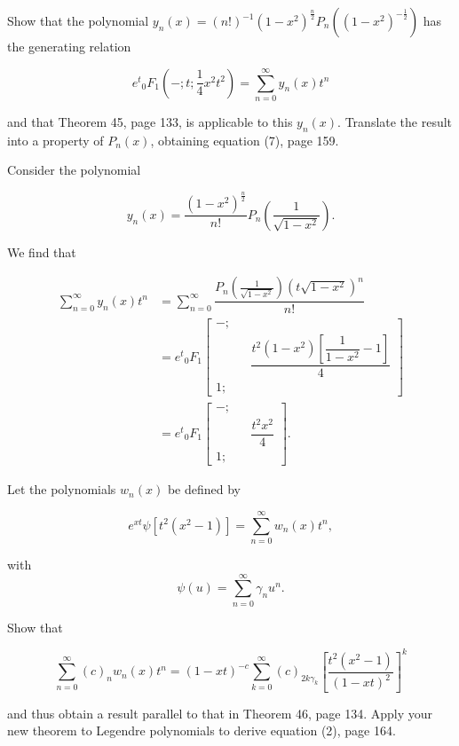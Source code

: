 \begin{problem}\label{problem20chapter10}
Show that the polynomial $y_n(x) = (n!)^{-1}(1-x^2)^{\frac{n}{2}} P_n((1-x^2)^{-\frac{1}{2}})$ has the generating relation

$$e^t {}_0F_1 \left( -;t;\dfrac{1}{4}x^2t^2 \right) = \displaystyle\sum_{n=0}^{\infty} y_n(x) t^n$$

and that Theorem 45, page 133, is applicable to this $y_n(x)$. Translate the result into a property of $P_n(x)$, obtaining equation (7), page 159.
\end{problem}
\begin{solution}
Consider the polynomial

$$y_n(x) = \dfrac{(1-x^2)^{\frac{n}{2}}}{n!} P_n \left( \dfrac{1}{\sqrt{1-x^2}} \right).$$

We find that

$$\begin{array}{ll}
\displaystyle\sum_{n=0}^{\infty} y_n(x) t^n &= \displaystyle\sum_{n=0}^{\infty} \dfrac{P_n \left(\frac{1}{\sqrt{1-x^2}} \right) (t \sqrt{1-x^2})^n}{n!} \\
&= e^t {}_0F_1 \left[ \begin{array}{rlr}
-; & & \\
& & \dfrac{t^2 (1-x^2) \left[ \dfrac{1}{1-x^2} -1 \right]}{4} \\
1; & &
\end{array} \right] \\
&= e^t {}_0F_1 \left[ \begin{array}{rlr}
-; & & \\
& & \dfrac{t^2x^2}{4} \\
1; & & 
\end{array} \right].
\end{array}$$
\end{solution}
\begin{problem}\label{problem21chapter10}
Let the polynomials $w_n(x)$ be defined by

$$e^{xt} \psi[t^2(x^2-1)] = \displaystyle\sum_{n=0}^{\infty} w_n(x) t^n,$$

with
\
$$\psi(u) = \displaystyle\sum_{n=0}^{\infty} \gamma_n u^n.$$

Show that 

$$\displaystyle\sum_{n=0}^{\infty} (c)_n w_n(x) t^n = (1-xt)^{-c} \displaystyle\sum_{k=0}^{\infty} (c)_{2k \gamma_k} \left[ \dfrac{t^2(x^2-1)}{(1-xt)^2} \right]^k$$

and thus obtain a result parallel to that in Theorem 46, page 134. Apply your new theorem to Legendre polynomials to derive equation (2), page 164.
\end{problem}
